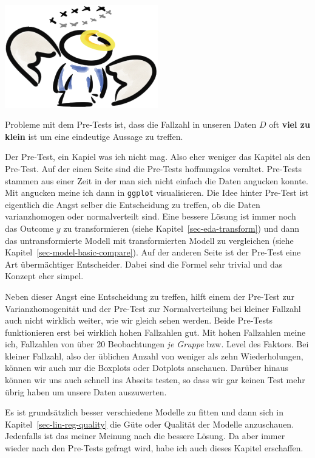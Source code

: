 \documentclass[
  letterpaper,
]{scrbook}
\begin{document}
\begin{marginfigure}

{\centering \includegraphics[width=0.5\textwidth,height=\textheight]{./images/angel_01.png}

}

\end{marginfigure}

Probleme mit dem Pre-Tests ist, dass die Fallzahl in unseren Daten \(D\)
oft \textbf{viel zu klein} ist um eine eindeutige Aussage zu treffen.

Der Pre-Test, ein Kapiel was ich nicht mag. Also eher weniger das
Kapitel als den Pre-Test. Auf der einen Seite sind die Pre-Tests
hoffnungslos veraltet. Pre-Tests stammen aus einer Zeit in der man sich
nicht einfach die Daten angucken konnte. Mit angucken meine ich dann in
\texttt{ggplot} visualisieren. Die Idee hinter Pre-Test ist eigentlich
die Angst selber die Entscheidung zu treffen, ob die Daten
varianzhomogen oder normalverteilt sind. Eine bessere Lösung ist immer
noch das Outcome \(y\) zu transformieren (siehe
Kapitel~\ref{sec-eda-transform}) und dann das untransformierte Modell
mit transformierten Modell zu vergleichen (siehe
Kapitel~\ref{sec-model-basic-compare}). Auf der anderen Seite ist der
Pre-Test eine Art übermächtiger Entscheider. Dabei sind die Formel sehr
trivial und das Konzept eher simpel.

Neben dieser Angst eine Entscheidung zu treffen, hilft einem der
Pre-Test zur Varianzhomogenität und der Pre-Test zur Normalverteilung
bei kleiner Fallzahl auch nicht wirklich weiter, wie wir gleich sehen
werden. Beide Pre-Tests funktionieren erst bei wirklich hohen Fallzahlen
gut. Mit hohen Fallzahlen meine ich, Fallzahlen von über 20
Beobachtungen \emph{je Gruppe} bzw. Level des Faktors. Bei kleiner
Fallzahl, also der üblichen Anzahl von weniger als zehn Wiederholungen,
können wir auch nur die Boxplots oder Dotplots anschauen. Darüber hinaus
können wir uns auch schnell ins Abseits testen, so dass wir gar keinen
Test mehr übrig haben um unsere Daten auszuwerten.

Es ist grundsätzlich besser verschiedene Modelle zu fitten und dann sich
in Kapitel~\ref{sec-lin-reg-quality} die Güte oder Qualität der Modelle
anzuschauen. Jedenfalls ist das meiner Meinung nach die bessere Lösung.
Da aber immer wieder nach den Pre-Tests gefragt wird, habe ich auch
dieses Kapitel erschaffen.
\end{document}
